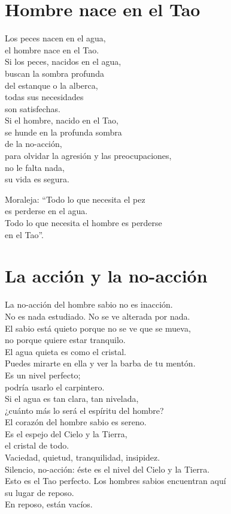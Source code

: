 \documentclass[hidelinks]{memoir}
\begin{document}
	\chapter*{Hombre nace en el Tao}
	
	Los peces nacen en el agua,\\
	el hombre nace en el Tao.\\
	Si los peces, nacidos en el agua,\\
	buscan la sombra profunda\\
	del estanque o la alberca,\\
	todas sus necesidades\\
	son satisfechas.\\
	Si el hombre, nacido en el Tao,\\
	se hunde en la profunda sombra\\
	de la no-acción,\\
	para olvidar la agresión y las preocupaciones,\\
	no le falta nada,\\
	su vida es segura.
	
	Moraleja: ``Todo lo que necesita el pez\\
	es perderse en el agua.\\
	Todo lo que necesita el hombre es perderse\\
	en el Tao''.
	
	\chapter*{La acción y la no-acción}
	
	La no-acción del hombre sabio no es inacción.\\
	No es nada estudiado. No se ve alterada por nada.\\
	El sabio está quieto porque no se ve que se mueva,\\
	no porque quiere estar tranquilo.\\
	El agua quieta es como el cristal.\\
	Puedes mirarte en ella y ver la barba de tu mentón.\\
	Es un nivel perfecto;\\
	podría usarlo el carpintero.\\
	Si el agua es tan clara, tan nivelada,\\
	¿cuánto más lo será el espíritu del hombre?\\
	El corazón del hombre sabio es sereno.\\
	Es el espejo del Cielo y la Tierra,\\
	el cristal de todo.\\
	Vaciedad, quietud, tranquilidad, insipidez.\\
	Silencio, no-acción: éste es el nivel del Cielo y la Tierra.\\
	Esto es el Tao perfecto. Los hombres sabios encuentran aquí\\
	su lugar de reposo.\\
	En reposo, están vacíos.
	
\end{document}
